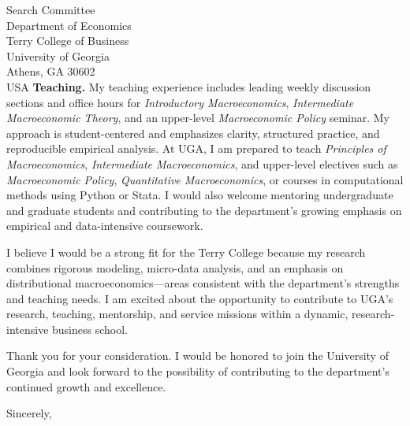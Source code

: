 \documentclass[11pt,letterpaper]{letter}
\begin{document}
\begin{letter}{Search Committee \\
Department of Economics \\
Terry College of Business \\
University of Georgia \\
Athens, GA 30602 \\ USA}
\textbf{Teaching.} My teaching experience includes leading weekly discussion sections and office hours for \textit{Introductory Macroeconomics}, \textit{Intermediate Macroeconomic Theory}, and an upper-level \textit{Macroeconomic Policy} seminar. My approach is student-centered and emphasizes clarity, structured practice, and reproducible empirical analysis. At UGA, I am prepared to teach \textit{Principles of Macroeconomics}, \textit{Intermediate Macroeconomics}, and upper-level electives such as \textit{Macroeconomic Policy}, \textit{Quantitative Macroeconomics}, or courses in computational methods using Python or Stata. I would also welcome mentoring undergraduate and graduate students and contributing to the department’s growing emphasis on empirical and data-intensive coursework.

I believe I would be a strong fit for the Terry College because my research combines rigorous modeling, micro-data analysis, and an emphasis on distributional macroeconomics—areas consistent with the department’s strengths and teaching needs. I am excited about the opportunity to contribute to UGA’s research, teaching, mentorship, and service missions within a dynamic, research-intensive business school.

Thank you for your consideration. I would be honored to join the University of Georgia and look forward to the possibility of contributing to the department’s continued growth and excellence.

\closing{Sincerely,}

\end{letter}
\end{document}

